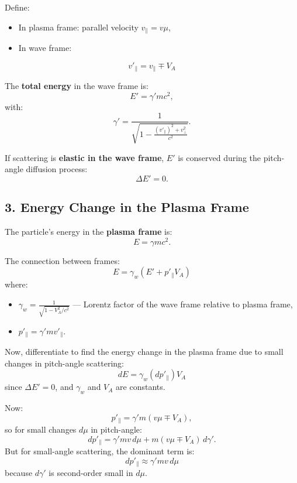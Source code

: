 Define:
\begin{itemize}
    \item In plasma frame: parallel velocity $v_\parallel = v \mu$,
    \item In wave frame:
\end{itemize}
\begin{equation}
v'_\parallel = v_\parallel \mp V_A
\tag{3}
\end{equation}

The \textbf{total energy} in the wave frame is:
\[
E' = \gamma' m c^2,
\]
with:
\[
\gamma' = \frac{1}{\sqrt{1 - \frac{(v'_\parallel)^2 + v_\perp^2}{c^2}}}.
\]

If scattering is \textbf{elastic in the wave frame}, $E'$ is conserved during the pitch-angle diffusion process:
\begin{equation}
\Delta E' = 0.
\tag{4}
\end{equation}

\hrulefill

\subsection*{3. \textbf{Energy Change in the Plasma Frame}}

The particle’s energy in the \textbf{plasma frame} is:
\[
E = \gamma m c^2.
\]

The connection between frames:
\begin{equation}
E = \gamma_w ( E' + p'_\parallel V_A )
\tag{5}
\end{equation}
where:
\begin{itemize}
    \item $\gamma_w = \frac{1}{\sqrt{1 - V_A^2/c^2}}$ --- Lorentz factor of the wave frame relative to plasma frame,
    \item $p'_\parallel = \gamma' m v'_\parallel$.
\end{itemize}

Now, differentiate to find the energy change in the plasma frame due to small changes in pitch-angle scattering:
\begin{equation}
dE = \gamma_w \left( d p'_\parallel \right) V_A
\tag{6}
\end{equation}
since $\Delta E' = 0$, and $\gamma_w$ and $V_A$ are constants.

Now:
\[
p'_\parallel = \gamma' m (v \mu \mp V_A),
\]
so for small changes $d\mu$ in pitch-angle:
\begin{equation}
d p'_\parallel = \gamma' m v \, d\mu + m (v \mu \mp V_A) \, d\gamma'.
\end{equation}
But for small-angle scattering, the dominant term is:
\begin{equation}
d p'_\parallel \approx \gamma' m v \, d\mu
\tag{7}
\end{equation}
because $d\gamma'$ is second-order small in $d\mu$.

